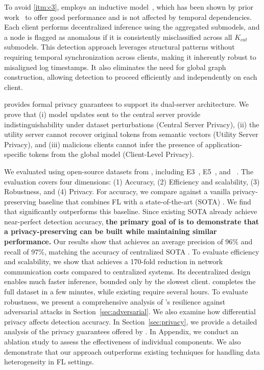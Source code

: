   To avoid \ref{itm:c3}, \Sys employs an inductive \gnnshort model~\cite{hamilton2017inductive}, which has been shown by prior work~\cite{flash2024,shadewatcher,wang2022threatrace} to offer good performance and is not affected by temporal dependencies. Each client performs decentralized inference using the aggregated submodels, and a node is flagged as anomalous if it is consistently misclassified across all \( K_{cat} \) submodels. This detection approach leverages structural patterns without requiring temporal synchronization across clients, making it inherently robust to misaligned log timestamps. It also eliminates the need for global graph construction, allowing detection to proceed efficiently and independently on each client.


  \Sys provides formal privacy guarantees to support its dual-server architecture.
We prove that (i) model updates sent to the central server provide indistinguishability under dataset perturbations (Central Server Privacy), (ii) the utility server cannot recover original tokens from semantic vectors (Utility Server Privacy), and (iii) malicious clients cannot infer the presence of application-specific tokens from the global model (Client-Level Privacy).



We evaluated \Sys using open-source datasets from \darpa, including E3~\cite{error3}, E5~\cite{bug5}, and \optc~\cite{anjum2021analyzing}. The evaluation covers four dimensions: (1) Accuracy, (2) Efficiency and scalability, (3) Robustness, and (4) Privacy. For accuracy, we compare \Sys against a vanilla privacy-preserving \pids baseline that combines FL with a state-of-the-art (SOTA) \pids. We find that \Sys significantly outperforms this baseline. Since existing SOTA \pids already achieve near-perfect detection accuracy, {\bf the primary goal of \Sys is to demonstrate that a privacy-preserving \pids can be built while maintaining similar performance.} Our results show that \Sys achieves an average precision of 96\% and recall of 97\%, matching the accuracy of centralized SOTA \pids. To evaluate efficiency and scalability, we show that \Sys achieves a 170-fold reduction in network communication costs compared to centralized systems. Its decentralized design enables much faster inference, bounded only by the slowest client. \Sys completes the full \optc dataset in a few minutes, while existing \pids require several hours. To evaluate robustness, we present a comprehensive analysis of \Sys’s resilience against adversarial attacks in Section~\ref{sec:adversarial}. We also examine how differential privacy affects detection accuracy. In Section~\ref{sec:privacy}, we provide a detailed analysis of the privacy guarantees offered by \Sys. In Appendix, we conduct an ablation study to assess the effectiveness of individual components. We also demonstrate that our approach outperforms existing techniques for handling data heterogeneity in FL settings. 

